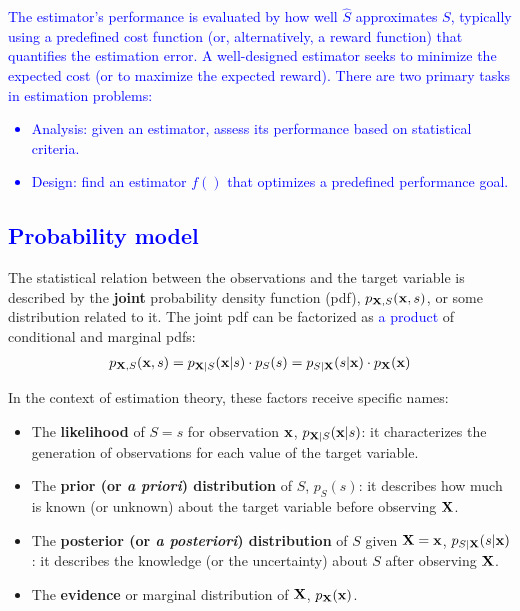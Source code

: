 \textcolor{blue}{The estimator's performance is evaluated by how well $\hat{S}$ approximates $S$, typically using a predefined cost function (or, alternatively, a reward function) that quantifies the estimation error. A well-designed estimator seeks to minimize the expected cost (or to maximize the expected reward). There are two primary tasks in estimation problems:
\begin{itemize}
\item Analysis: given an estimator, assess its performance based on statistical criteria.
\item Design: find an estimator $f()$ that optimizes a predefined performance goal.
\end{itemize}
}

\subsection{\textcolor{blue}{Probability model}}
\label{subsec:statistical_info}

The statistical relation between the observations and the target variable is described by the {\bf joint} probability density function (pdf), $p_{{\bf X},S}({\bf x},s)$, or some distribution related to it. The joint pdf can be factorized as \textcolor{blue}{a product} of conditional and marginal pdfs:
\begin{align}
p_{{\bf X},S}({\bf x},s) = p_{{\bf X}| S}({\bf x}| s) \cdot p_S(s) 
                         = p_{S|{\bf X}}(s|{\bf x}) \cdot p_{\bf X}({\bf x}) 
\end{align}

In the context of estimation theory, these factors receive specific names:

\begin{itemize}
\item The {\bf likelihood} of $S=s$ for observation ${\bf x}$, $p_{{\bf X}|S}({\bf x}|s)$: it characterizes the generation of observations for each value of the target variable.
\item The {\bf prior (or \textit{a priori}) distribution}  of $S$, $p_S(s)$: it describes how much is known (or unknown) about the target variable before observing ${\bf X}$. 
\item The {\bf posterior (or \textit{a posteriori}) distribution} of $S$ given ${\bf X}={\bf x}$, $p_{S|{\bf X}}(s|{\bf x})$: it describes the knowledge (or the uncertainty) about $S$ after observing ${\bf X}$.
\item The {\bf evidence} or marginal distribution of ${\bf X}$, $p_{{\bf X}}({\bf x})$.
\end{itemize}

